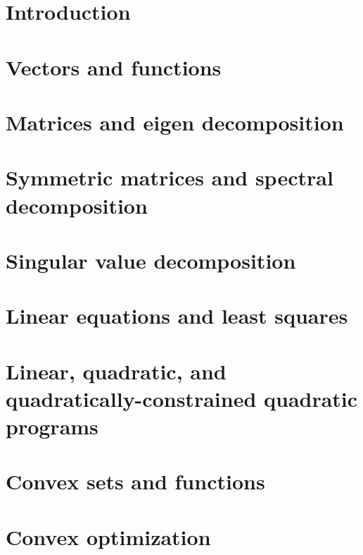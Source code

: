 \documentclass{tufte-book} %
\theoremstyle{definition}
\theoremstyle{remark}
\numberwithin{section}{chapter}
\numberwithin{equation}{chapter}
\numberwithin{figure}{chapter}
\begin{document}
\chapter{Introduction}
\label{ch.intro}


\chapter{Vectors and functions}
\label{ch.vecFunc}




\chapter{Matrices and eigen decomposition}
\label{ch.matEig}



\chapter{Symmetric matrices and spectral decomposition}
\label{ch.symmMat}



\chapter{Singular value decomposition}
\label{ch.SVD}


\chapter{Linear equations and least squares}
\label{ch.linEqLS}


\chapter{Linear, quadratic, and quadratically-constrained quadratic programs}
\label{ch.linQuadGeom}


\chapter{Convex sets and functions}
\label{ch.convex}


\chapter{Convex optimization}
\label{ch.convex}

\end{document}

